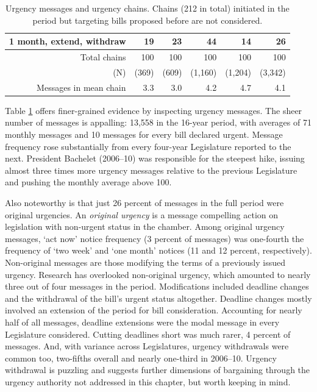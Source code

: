 \documentclass[letter,12pt]{article}
\begin{document}
\begin{table}
\begin{tabular}{rrrrr|r}
1 month, extend, withdraw & 19 & 23 & 44 & 14 &  26  \\ \hline
Total chains              & 100 & 100 & 100 & 100 & 100  \\
(N)                       & (369) & (609) & (1,160) & (1,204) &(3,342) \\ 
Messages in mean chain    & 3.3   & 3.0   & 4.2     & 4.7     & 4.1 \\ \hline
\end{tabular}
\caption{Urgency messages and urgency chains. Chains (212 in total) initiated in the period but targeting bills proposed before are not considered.}\label{t:freqUrg}
\end{table}

Table \ref{t:freqUrg} offers finer-grained evidence by inspecting urgency messages. The sheer number of messages is appalling: 13,558 in the 16-year period, with averages of 71 monthly messages and 10 messages for every bill declared urgent. Message frequency rose substantially from every four-year Legislature reported to the next. President Bachelet (2006--10) was responsible for the steepest hike, issuing almost three times more urgency messages relative to the previous Legislature and pushing the monthly average above 100. 

Also noteworthy is that just 26 percent of messages in the full period were original urgencies. An \emph{original urgency} is a message compelling action on legislation with non-urgent status in the chamber. Among original urgency messages, `act now' notice frequency (3 percent of messages) was one-fourth the frequency of `two week' and `one month' notices (11 and 12 percent, respectively). Non-original messages are those modifying the terms of a previously issued urgency. Research has overlooked non-original urgency, which amounted to nearly three out of four messages in the period. Modifications included deadline changes and the withdrawal of the bill's urgent status altogether. Deadline changes mostly involved an extension of the period for bill consideration. Accounting for nearly half of all messages, deadline extensions were the modal message in every Legislature considered. Cutting deadlines short was much rarer, 4 percent of messages. And, with variance across Legislatures, urgency withdrawals were common too, two-fifths overall and nearly one-third in 2006--10. Urgency withdrawal is puzzling and suggests further dimensions of bargaining through the urgency authority not addressed in this chapter, but worth keeping in mind. 
\end{document}
